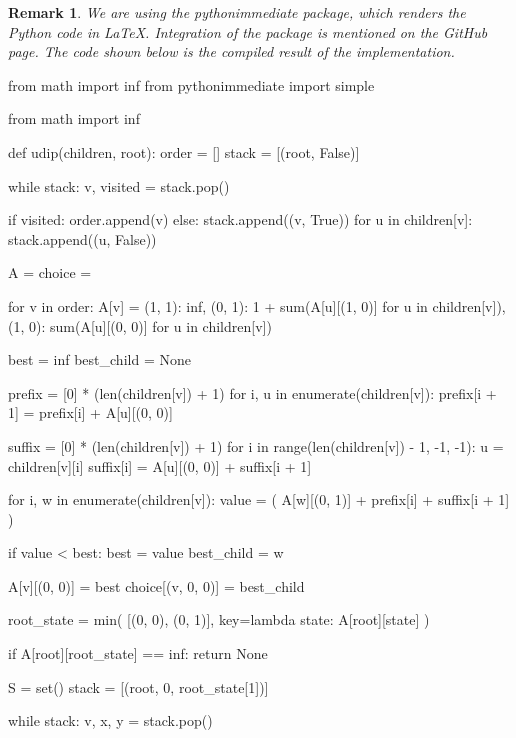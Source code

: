 \documentclass[ a4paper, 11pt]{report}
\theoremstyle{plain}
\newtheorem{remark}[theorem]{Remark}
\theoremstyle{definition}
\begin{document}
\begin{remark} We are using the pythonimmediate package, which renders the Python code in LaTeX. Integration of the package is mentioned on the GitHub page. The code shown below is the compiled result of the implementation.
\end{remark}
\begin{pycode}
from math import inf
from pythonimmediate import simple


from math import inf


def udip(children, root):
    order = []
    stack = [(root, False)]

    while stack:
        v, visited = stack.pop()

        if visited:
            order.append(v)
        else:
            stack.append((v, True))
            for u in children[v]:
                stack.append((u, False))

    A = {}
    choice = {}

    for v in order:
        A[v] = {
            (1, 1): inf,
            (0, 1): 1 + sum(A[u][(1, 0)] for u in children[v]),
            (1, 0): sum(A[u][(0, 0)] for u in children[v])
        }

        best = inf
        best_child = None

        prefix = [0] * (len(children[v]) + 1)
        for i, u in enumerate(children[v]):
            prefix[i + 1] = prefix[i] + A[u][(0, 0)]

        suffix = [0] * (len(children[v]) + 1)
        for i in range(len(children[v]) - 1, -1, -1):
            u = children[v][i]
            suffix[i] = A[u][(0, 0)] + suffix[i + 1]

        for i, w in enumerate(children[v]):
            value = (
                A[w][(0, 1)]
                + prefix[i]
                + suffix[i + 1]
            )

            if value < best:
                best = value
                best_child = w

        A[v][(0, 0)] = best
        choice[(v, 0, 0)] = best_child

    root_state = min(
        [(0, 0), (0, 1)],
        key=lambda state: A[root][state]
    )

    if A[root][root_state] == inf:
        return None

    S = set()
    stack = [(root, 0, root_state[1])]

    while stack:
        v, x, y = stack.pop()


\end{pycode}
\end{document}
